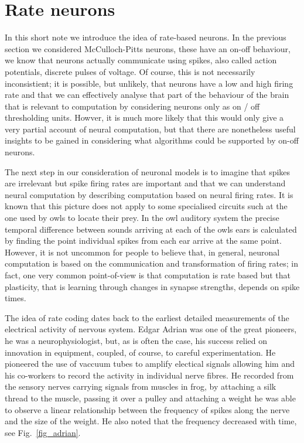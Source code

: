 \documentclass[12pt]{article}
\begin{document}
\section*{Rate neurons} 

In this short note we introduce the idea of rate-based neurons. In the
previous section we considered McCulloch-Pitts neurons, these have an
on-off behaviour, we know that neurons actually communicate using
spikes, also called action potentials, discrete pulses of voltage. Of
course, this is not necessarily inconsistient; it is possible, but
unlikely, that neurons have a low and high firing rate and that we can
effectively analyse that part of the behaviour of the brain that is
relevant to computation by considering neurons only as on / off
thresholding units. Howver, it is much more likely that this would only give a
very partial account of neural computation, but that there are
nonetheless useful insights to be gained in considering what
algorithms could be supported by on-off neurons.

The next step in our consideration of neuronal models is to imagine
that spikes are irrelevant but spike firing rates are important and
that we can understand neural computation by describing computation
based on neural firing rates. It is known that this picture does not
apply to some specialised circuits such at the one used by owls to
locate their prey. In the owl auditory system the precise temporal
difference between sounds arriving at each of the owls ears is
calculated by finding the point individual spikes from each ear arrive
at the same point. However, it is not uncommon for people to believe
that, in general, neuronal computation is based on the communication
and transformation of firing rates; in fact, one very common
point-of-view is that computation is rate based but that plasticity,
that is learning through changes in synapse strengths, depends on spike times.

The idea of rate coding dates back to the earliest detailed
measurements of the electrical activity of nervous system. Edgar
Adrian was one of the great pioneers, he was a neurophysiologist, but,
as is often the case, his success relied on innovation in equipment,
coupled, of course, to careful experimentation. He pioneered the use
of vaccuum tubes to amplify electical signals allowing him and his
co-workers to record the activity in individual nerve fibres. He
recorded from the sensory nerves carrying signals from muscles in
frog, by attaching a silk thread to the muscle, passing it over a
pulley and attaching a weight he was able to observe a linear
relationship between the frequency of spikes along the nerve and the
size of the weight. He also noted that the frequency decreased with
time, see Fig.~\ref{fig_adrian}.
\end{document}
